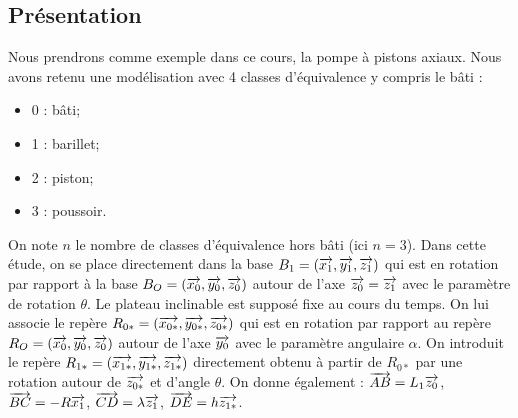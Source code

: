 \documentclass[10pt,fleqn]{article} %
\begin{document}
\def\pathfig{images}

\vspace{4.5cm}
\pagestyle{fancy}
\thispagestyle{plain}

\def\columnseprulecolor{\color{ocre}}
\setlength{\columnseprule}{0.4pt} 

\def\pathfig{images}


\ifprof
\begin{multicols}{2}
\else
\begin{multicols}{2}
\fi
%




\subsection*{Présentation}
Nous prendrons comme exemple dans ce cours, la pompe à pistons axiaux. Nous avons retenu une modélisation avec 4 classes d'équivalence y compris le bâti :

\begin{itemize}
\item 0 : bâti;
\item 1 : barillet;
\item 2 : piston;
\item 3 : poussoir.
\end{itemize}

On note $n$ le nombre de classes d'équivalence hors bâti (ici $n=3$).
Dans cette étude, on se place directement dans la base $B_{1}=\left(\overrightarrow{{x_{1}}},\overrightarrow{{y_{1}}},\overrightarrow{{z_{1}}} \right)$ qui est en rotation par rapport à la base $B_{O}=\left(\overrightarrow{{x_{0}}},\overrightarrow{{y_{0}}},\overrightarrow{{z_{0}}} \right)$ autour de l'axe $\overrightarrow{z_{0}}=\overrightarrow{z_{1}}$ avec le paramètre de rotation $\theta$.
Le plateau inclinable est supposé fixe au cours du temps. On lui associe le repère $R_{0*}=\left(\overrightarrow{{x_{0*}}},\overrightarrow{{y_{0*}}},\overrightarrow{{z_{0*}}} \right)$ qui est en rotation par rapport au repère $R_{O}=\left(\overrightarrow{{x_{0}}},\overrightarrow{{y_{0}}},\overrightarrow{{z_{0}}} \right)$ autour de l'axe $\overrightarrow{y_{0}}$ avec le paramètre angulaire $\alpha$. On introduit le repère $R_{1*}=\left(\overrightarrow{{x_{1*}}},\overrightarrow{{y_{1*}}},\overrightarrow{{z_{1*}}} \right)$ directement obtenu à partir de $R_{0*}$ par une rotation autour de $\overrightarrow{z_{0*}}$ et d'angle $\theta$.
On donne également :
$\overrightarrow{AB}=L_1\overrightarrow{z_0}$, $\overrightarrow{BC}=-R\overrightarrow{x_1}$, $\overrightarrow{CD}=\lambda\overrightarrow{z_1}$, $\overrightarrow{DE}=h\overrightarrow{z_{1*}}$.



\end{multicols}
\end{multicols}
\end{document}
